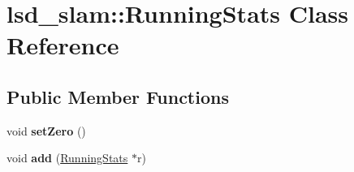 \hypertarget{classlsd__slam_1_1_running_stats}{\section{lsd\-\_\-slam\-:\-:Running\-Stats Class Reference}
\label{classlsd__slam_1_1_running_stats}
}
\subsection*{Public Member Functions}
\begin{DoxyCompactItemize}
\item 
\hypertarget{classlsd__slam_1_1_running_stats_a96d044be6bad4101fe9922f26711b1fe}{void {\bfseries set\-Zero} ()}\label{classlsd__slam_1_1_running_stats_a96d044be6bad4101fe9922f26711b1fe}

\item 
\hypertarget{classlsd__slam_1_1_running_stats_a719f0b8d058ff628cf564d57794999fd}{void {\bfseries add} (\hyperlink{classlsd__slam_1_1_running_stats}{Running\-Stats} $\ast$r)}\label{classlsd__slam_1_1_running_stats_a719f0b8d058ff628cf564d57794999fd}

\end{DoxyCompactItemize}
